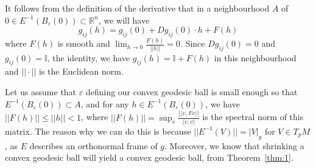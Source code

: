 \documentclass[aps,pra,showpacs,notitlepage,onecolumn,superscriptaddress,nofootinbib]{revtex4-1}
\theoremstyle{definition}
\begin{document}
\noindent It follows from the definition of the derivative that in a neighbourhood $A$ of $0 \in E^{-1}(B_{\varepsilon}(0)) \subset \mathbb{R}^n$, we will have
\begin{equation}
  g_{ij}(h) = g_{ij}(0) + Dg_{ij}(0) \cdot h + F(h)
\end{equation}
where $F(h)$ is smooth and $\lim_{h \to 0} \frac{F(h)}{||h||} = 0$. Since $Dg_{ij}(0) = 0$ and $g_{ij}(0) = \mathbb{I}$, the identity,
we have $g_{ij}(h) = \mathbb{I} + F(h)$ in this neighbourhood and $||\cdot||$ is the Euclidean norm.
\newline

\noindent Let us assume that $\varepsilon$ defining our convex geodesic ball is small enough so that $E^{-1}(B_{\varepsilon}(0)) \subset A$, and for any $h \in E^{-1}(B_{\varepsilon}(0))$, we have $||F(h)|| \leq ||h|| < 1$,
where $||F(h)|| = \sup_v \frac{|\langle v, F v \rangle|}{\langle v, v\rangle}$ is the spectral norm of this matrix.
The reason why we can do this is because $||E^{-1}(V)|| = |V|_g$ for $V \in T_p M$, as $E$ describes an orthonormal frame of $g$.
Moreover, we know that shrinking a convex geodesic ball will yield a convex geodesic ball, from Theorem~\ref{thm:1}.
\newline
\end{document}
